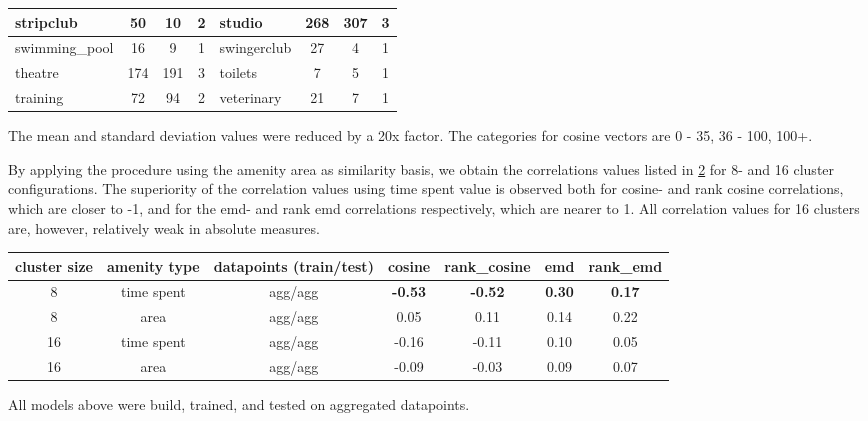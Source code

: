 \begin{table}[!ht]
{\begin{tabular}{ | l | c | c | c || l | c | c | c |}
				stripclub & 50 & 10 & 2 & studio & 268 & 307 & 3 \\ \hline
				swimming\_pool & 16 & 9 & 1 & swingerclub & 27 & 4 & 1 \\ \hline
				theatre & 174 & 191 & 3 & toilets & 7 & 5 & 1 \\ \hline
				training & 72 & 94 & 2 & veterinary & 21 & 7 & 1 \\ \hline
		\end{tabular}}
		\label{tab:amenity_area_values}
		\begin{tabnote}
			The mean and standard deviation values were reduced by a 20x factor. The categories for cosine vectors are 0 - 35, 36 - 100, 100+.
		\end{tabnote}
	\end{table}
	
	By applying the procedure using the amenity area as similarity basis, we obtain the correlations values listed in \cref{tab:correlation_amenity_area} for 8- and 16 cluster configurations. The superiority of the correlation values using time spent value is observed both for cosine- and rank cosine correlations, which are closer to -1, and for the emd- and rank emd correlations respectively, which are nearer to 1. All correlation values for 16 clusters are, however, relatively weak in absolute measures.
	
	\begin{table}[!ht]
		{\begin{tabular}{ | c | c | c | c | c | c | c | }
				\hline
				{cluster size} 	& {amenity type} 	& datapoints (train/test) 	& cosine 	& rank\_cosine & emd & rank\_emd \\ \hline
				8 				& {time spent} 		& agg/agg 		& \textbf{-0.53}	& \textbf{-0.52}		&	\textbf{0.30}	&	\textbf{0.17} \\ \hline
				8 				& area 				& agg/agg 		& 0.05	&	0.11	&	0.14	&	0.22 \\ \hline \hline
				16 				& {time spent} 		& agg/agg 		& -0.16	&	-0.11	&	0.10	&	0.05 \\ \hline
				16 				& area 				& agg/agg 		& -0.09	&	-0.03	&	0.09	&	0.07 \\ \hline
		\end{tabular}}
		\begin{tabnote}
			All models above were build, trained, and tested on aggregated datapoints.  
		\end{tabnote}
		\label{tab:correlation_amenity_area}
	\end{table}
							
